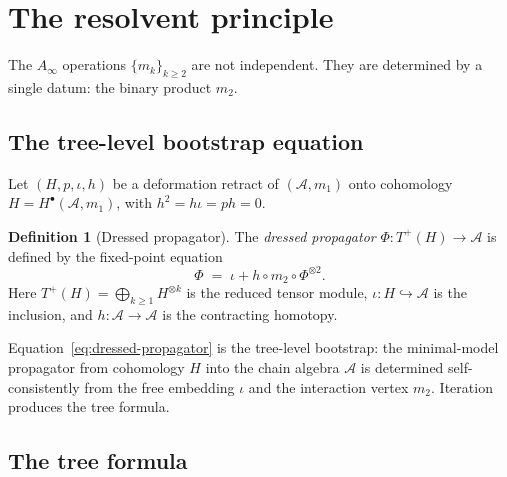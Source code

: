 \documentclass[11pt,reqno]{amsart}
\theoremstyle{definition}
\newtheorem{definition}[theorem]{Definition}
\theoremstyle{remark}
\newcommand{\cA}{\mathcal{A}}
\newcommand{\Ainf}{A_{\infty}}
\numberwithin{equation}{section}
\begin{document}
\section{The resolvent principle}
\label{sec:resolvent}

The $\Ainf$ operations $\{m_k\}_{k \geq 2}$ are not independent.
They are determined by a single datum: the binary product $m_2$.

\subsection{The tree-level bootstrap equation}

Let $(H, p, \iota, h)$ be a deformation retract of
$(\cA, m_1)$ onto cohomology $H = H^\bullet(\cA, m_1)$, with
$h^2 = h\iota = ph = 0$.

\begin{definition}[Dressed propagator]
\label{def:dressed-propagator}
The \emph{dressed propagator}
$\Phi \colon T^+(H) \to \cA$ is defined by the fixed-point
equation
\begin{equation}\label{eq:dressed-propagator}
  \Phi
  \;=\;
  \iota + h \circ m_2 \circ \Phi^{\otimes 2}.
\end{equation}
Here $T^+(H) = \bigoplus_{k \geq 1} H^{\otimes k}$ is the
reduced tensor module, $\iota \colon H \hookrightarrow \cA$ is
the inclusion, and $h \colon \cA \to \cA$ is the contracting
homotopy.
\end{definition}

Equation~\eqref{eq:dressed-propagator} is the tree-level
bootstrap: the minimal-model propagator from cohomology $H$ into the
chain algebra $\cA$ is determined self-consistently from the free
embedding $\iota$ and the interaction vertex $m_2$.  Iteration
produces the tree formula.

\subsection{The tree formula}
\end{document}
